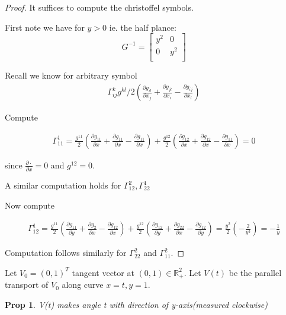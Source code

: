 \documentclass[11pt]{article}
\newcommand{\R}{\mathbb{R}}
\newtheorem{prop}{Prop}
\begin{document}
\begin{proof}
	It suffices to compute the christoffel symbols.

	First note we have for $y > 0$ ie. the half plance:
	\[G^{-1} = 
			\begin{bmatrix}
				y^2 & 0\\
				0 & y^2\\
			\end{bmatrix}
	\]

	Recall we know for arbitrary symbol
	\begin{align*}
		\Gamma_{ij}^k g^{kl}/2(\frac{\partial g_{il}}{\partial x_j} + \frac{\partial g_{jl}}{\partial x_i} - \frac{\partial g_{ij}}{\partial x_l})
	\end{align*}

	Compute

	\begin{align*}
		\Gamma_{11}^1 = \frac{g^{11}}{2}(\frac{\partial g_{11}}{\partial x} + \frac{\partial g_{11}}{\partial x} - \frac{\partial g_{11}}{\partial x}) + \frac{g^{12}}{2}(\frac{\partial g_{12}}{\partial x} + \frac{\partial g_{12}}{\partial x} - \frac{\partial g_{11}}{\partial x}) = 0
	\end{align*}

	since $\frac{\partial \cdot}{\partial x} = 0 $ and $g^{12} = 0$. 

	A similar computation holds for $\Gamma_{12}^2, \Gamma_{22}^1$

	Now compute

	\begin{align*}
		\Gamma_{12}^1 = \frac{g^{11}}{2}(\frac{\partial g_{11}}{\partial y} + \frac{\partial g_{2}}{\partial x} - \frac{\partial g_{12}}{\partial x}) + \frac{g^{12}}{2}(\frac{\partial g_{12}}{\partial y} + \frac{\partial g_{22}}{\partial x} - \frac{\partial g_{12}}{\partial y}) = \frac{y^2}{2}(-\frac{2}{y^3}) = -\frac{1}{y}
	\end{align*}

	Computation follows similarly for $\Gamma_{22}^2$ and $\Gamma_{11}^2$. 
	
\end{proof}

Let $V_0 = (0,1)^T$ tangent vector at $(0,1) \in \R_+^2$. Let $V(t)$ be the parallel transport of $V_0$ along curve $x = t,y=1$. 

\begin{prop}
	V(t) makes angle t with direction of y-axis(measured clockwise)
\end{prop}
\end{document}
